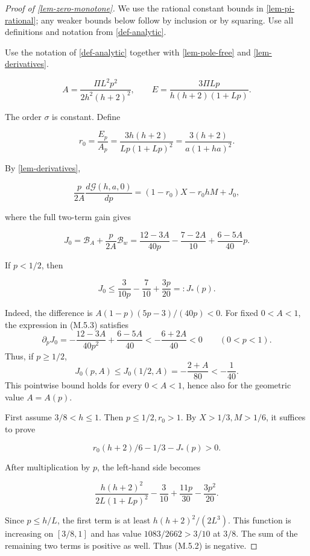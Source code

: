 \documentclass[11pt,a4paper]{article}
\theoremstyle{proofmanuscript}
\begin{document}
\begin{proof}[Proof of \ref{lem-zero-monotone}]

We use the rational constant bounds in \ref{lem-pi-rational}; any weaker bounds below follow by inclusion or by squaring. Use all definitions and notation from \ref{def-analytic}.

Use the notation of \ref{def-analytic} together with \ref{lem-pole-free} and \ref{lem-derivatives}.

\[
A=\frac{\Pi L^2p^2}{2h^2(h+2)^2},\qquad
E=\frac{3\Pi Lp}{h(h+2)(1+Lp)}.
\]

The order \(\sigma\) is constant. Define

\[
r_0=\frac{E_p}{A_p}
=\frac{3h(h+2)}{Lp(1+Lp)^2}
=\frac{3(h+2)}{a(1+ha)^2}.
\]

By \ref{lem-derivatives},

\[
\frac p{2A}\frac{d\mathcal G(h,a,0)}{dp}
=(1-r_0)X-r_0hM+J_0,                                    \tag{M.5.2}
\]

where the full two-term gain gives

\[
J_0=\mathcal B_A+\frac p{2A}\mathcal B_w
=\frac{12-3A}{40p}-\frac{7-2A}{10}+\frac{6-5A}{40}p.      \tag{M.5.3}
\]

If \(p<1/2\), then

\[
J_0\le \frac3{10p}-\frac7{10}+\frac{3p}{20}
=:J_*(p).                                                \tag{M.5.4}
\]

Indeed, the difference is \(A(1-p)(5p-3)/(40p)<0\). For fixed \(0<A<1\), the expression in (M.5.3) satisfies \[
\partial_pJ_0=-\frac{12-3A}{40p^2}+\frac{6-5A}{40}
<-\frac{6+2A}{40}<0\qquad(0<p<1).
\] Thus, if \(p\ge1/2\), \[
J_0(p,A)\le J_0(1/2,A)=-\frac{2+A}{80}<-\frac1{40}.
\] This pointwise bound holds for every \(0<A<1\), hence also for the geometric value \(A=A(p)\).

First assume \(3/8<h\le1\). Then \(p\le1/2,r_0>1\). By \(X>1/3,M>1/6\), it suffices to prove

\[
r_0(h+2)/6-1/3-J_*(p)>0.
\]

After multiplication by \(p\), the left-hand side becomes

\[
\frac{h(h+2)^2}{2L(1+Lp)^2}
-\frac3{10}+\frac{11p}{30}-\frac{3p^2}{20}.
\]

Since \(p\le h/L\), the first term is at least \(h(h+2)^2/(2L^3)\). This function is increasing on \([3/8,1]\) and has value \(1083/2662>3/10\) at \(3/8\). The sum of the remaining two terms is positive as well. Thus (M.5.2) is negative.


\end{proof}
\end{document}
